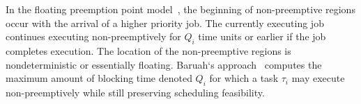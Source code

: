 In the floating preemption point model~\cite{baruah:05}, the beginning of non-preemptive regions occur with the arrival of a higher priority job.  The currently executing job continues executing non-preemptively for \begin{math}Q_{i}\end{math} time units or earlier if the job completes execution. The location of the non-preemptive regions is nondeterministic or essentially floating. Baruah`s approach~\cite{baruah:05} computes the maximum amount of blocking time denoted \begin{math}Q_{i}\end{math} for which a task \begin{math}\tau_{i}\end{math} may execute non-preemptively while still preserving scheduling feasibility.

